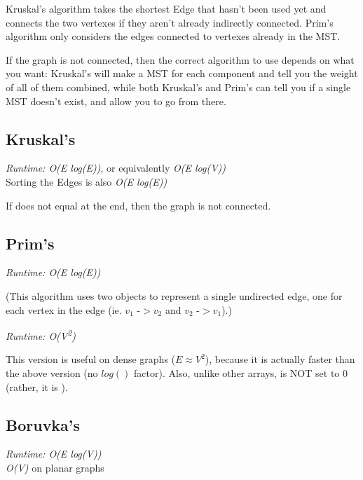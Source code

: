 
Kruskal's algorithm takes the shortest Edge that hasn't been used yet and connects the two vertexes if they aren't already indirectly connected. Prim's algorithm only considers the edges connected to vertexes already in the MST.

If the graph is not connected, then the correct algorithm to use depends on what you want: Kruskal's will make a MST for each component and tell you the weight of all of them combined, while both Kruskal's and Prim's can tell you if a single MST doesn't exist, and allow you to go from there.

\subsection*{Kruskal's}

\textit{Runtime: O(E log(E))}, or equivalently \textit{O(E log(V))} \\
\indent Sorting the Edges is also \textit{O(E log(E))}

If  does not equal  at the end, then the graph is not connected.



\subsection*{Prim's}

\textit{Runtime: O(E log(E))}

(This algorithm uses two  objects to represent a single undirected edge, one for each vertex in the edge (ie. $v_1$ -$> v_2$ and $v_2$ -$> v_1$).)



\textit{Runtime: O(V\textsuperscript{2})}

This version is useful on dense graphs ($E \approx V^2$), because it is actually faster than the above version (no $log()$ factor). Also, unlike other  arrays,  is NOT set to 0 (rather, it is ).



\subsection*{Boruvka's}

\textit{Runtime: O(E log(V))} \\
\indent \textit{O(V)} on planar graphs

\newpage